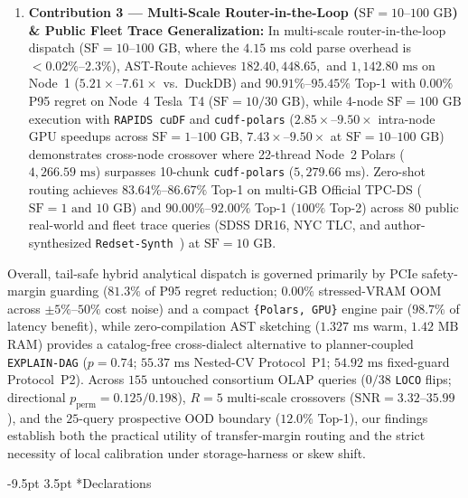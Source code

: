 \documentclass[10pt,a4paper]{article}
\makeatletter
\renewcommand\section{\@startsection{section}{1}{\z@}%
  {-9.5pt \@plus -2pt \@minus -1.5pt}%
  {3.5pt \@plus 1pt}%
  {\normalfont\large\bfseries}}
\makeatother
\begin{document}
\begin{enumerate}[leftmargin=1.5em,itemsep=1.5pt]
    \item \textbf{Contribution 3 --- Multi-Scale Router-in-the-Loop ($\text{SF}=10\text{--}100\text{ GB}$) \& Public Fleet Trace Generalization:} In multi-scale router-in-the-loop dispatch ($\text{SF}=10\text{--}100\text{ GB}$, where the $4.15\text{ ms}$ cold parse overhead is $<0.02\%\text{--}2.3\%$), AST-Route achieves $182.40, 448.65,$ and $1{,}142.80\text{ ms}$ on Node~1 ($5.21\times\text{--}7.61\times$ vs.\ DuckDB) and $90.91\%\text{--}95.45\%$ Top-1 with $0.00\%$ P95 regret on Node~4 Tesla~T4 ($\text{SF}=10/30\text{ GB}$), while 4-node $\text{SF}=100\text{ GB}$ execution with \texttt{RAPIDS cuDF} and \texttt{cudf-polars} ($2.85\times\text{--}9.50\times$ intra-node GPU speedups across $\text{SF}=1\text{--}100\text{ GB}$, $7.43\times\text{--}9.50\times$ at $\text{SF}=10\text{--}100\text{ GB}$) demonstrates cross-node crossover where 22-thread Node~2 Polars ($4{,}266.59\text{ ms}$) surpasses 10-chunk \texttt{cudf-polars} ($5{,}279.66\text{ ms}$). Zero-shot routing achieves $83.64\%\text{--}86.67\%$ Top-1 on multi-GB Official TPC-DS ($\text{SF}=1\text{ and }10\text{ GB}$) and $90.00\%\text{--}92.00\%$ Top-1 ($100\%$ Top-2) across $80$ public real-world and fleet trace queries (SDSS DR16, NYC TLC, and author-synthesized \texttt{Redset-Synth}~\cite{vanrenen2024redset}) at $\text{SF}=10\text{ GB}$.
\end{enumerate}


Overall, tail-safe hybrid analytical dispatch is governed primarily by PCIe safety-margin guarding ($81.3\%$ of P95 regret reduction; $0.00\%$ stressed-VRAM OOM across $\pm 5\%\text{--}50\%$ cost noise) and a compact \texttt{\{Polars, GPU\}} engine pair ($98.7\%$ of latency benefit), while zero-compilation AST sketching ($1.327\text{ ms}$ warm, $1.42\text{ MB}$ RAM) provides a catalog-free cross-dialect alternative to planner-coupled \texttt{EXPLAIN-DAG} ($p=0.74$; $55.37\text{ ms}$ Nested-CV Protocol~P1; $54.92\text{ ms}$ fixed-guard Protocol~P2). Across $155$ untouched consortium OLAP queries ($0/38$ \texttt{LOCO} flips; directional $p_{\text{perm}}=0.125/0.198$), $R=5$ multi-scale crossovers ($\text{SNR}=3.32\text{--}35.99$), and the $25$-query prospective OOD boundary ($12.0\%$ Top-1), our findings establish both the practical utility of transfer-margin routing and the strict necessity of local calibration under storage-harness or skew shift.

\section*{Declarations}
\enlargethispage{1.8\baselineskip}
\vspace{-5pt}
\end{document}
